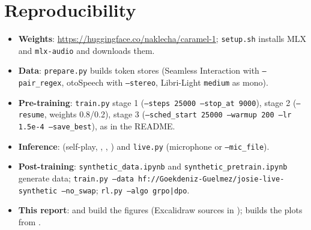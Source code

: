 \documentclass[10pt]{article}
\begin{document}
\section{Reproducibility}
\begin{itemize}\itemsep0pt
\item \textbf{Weights}: \url{https://huggingface.co/naklecha/caramel-1}; \texttt{setup.sh} installs MLX and \texttt{mlx-audio} and downloads them.
\item \textbf{Data}: \texttt{prepare.py} builds token stores (Seamless Interaction with \texttt{--pair\_regex}, otoSpeech with \texttt{--stereo}, Libri-Light \texttt{medium} as mono).
\item \textbf{Pre-training}: \texttt{train.py} stage 1 (\texttt{--steps 25000 --stop\_at 9000}), stage 2 (\texttt{--resume}, weights 0.8/0.2), stage 3 (\texttt{--sched\_start 25000 --warmup 200 --lr 1.5e-4 --save\_best}), as in the README.
\item \textbf{Inference}:  (self-play, , , ) and \texttt{live.py} (microphone or \texttt{--mic\_file}).
\item \textbf{Post-training}: \texttt{synthetic\_data.ipynb} and \texttt{synthetic\_pretrain.ipynb} generate data; \texttt{train.py --data hf://Goekdeniz-Guelmez/josie-live-synthetic --no\_swap}; \texttt{rl.py --algo grpo|dpo}.
\item \textbf{This report}:  and  build the figures (Excalidraw sources in );  builds the plots from .
\end{itemize}
\end{document}

